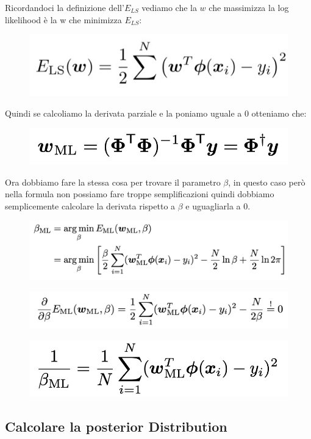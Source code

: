 \documentclass[14pt]{extreport}
\begin{document}
Ricordandoci la definizione dell'$E_{LS}$ vediamo che la $w$ che massimizza la log likelihood è la w che minimizza $E_{LS}$:

\begin{figure}[H]
	\centering
	\includegraphics[width=0.4\linewidth]{110.jpeg}
\end{figure}

Quindi se calcoliamo la derivata parziale e la poniamo uguale a 0 otteniamo che:
\begin{figure}[H]
	\centering
	\includegraphics[width=0.5\linewidth]{112.jpeg}
\end{figure}

Ora dobbiamo fare la stessa cosa per trovare il parametro $\beta$, in questo caso però nella formula non possiamo fare troppe semplificazioni quindi
dobbiamo semplicemente calcolare la derivata rispetto a $\beta$ e uguagliarla a 0.

\begin{figure}[H]
	\centering
	\includegraphics[width=0.6\linewidth]{113.jpeg}
\end{figure}
\begin{figure}[H]
	\centering
	\includegraphics[width=0.6\linewidth]{114.jpeg}
\end{figure}
\begin{figure}[H]
	\centering
	\includegraphics[width=0.4\linewidth]{115.jpeg}
\end{figure}

\subsection{Calcolare la posterior Distribution}
\end{document}
